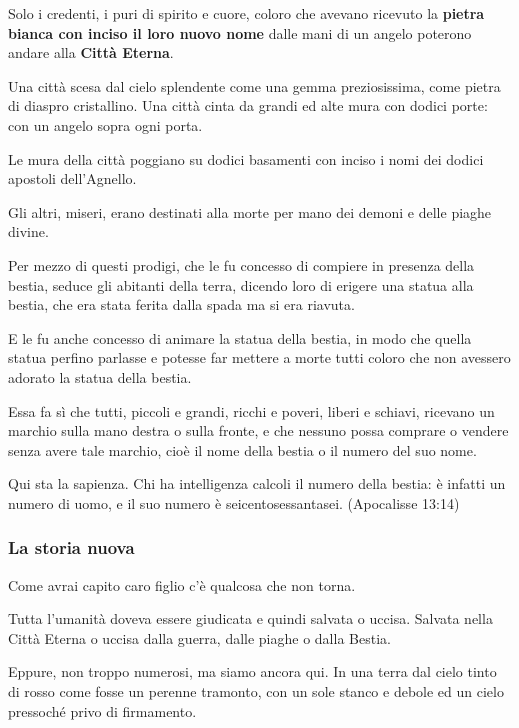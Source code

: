 \documentclass[a4paper,twoside,openany]{book}
\begin{document}
\begin{multicols}{2}
Solo i credenti, i puri di spirito e cuore, coloro che avevano ricevuto la \textbf{pietra bianca con inciso il loro nuovo nome} dalle mani di un angelo poterono andare alla \textbf{Città Eterna}.

Una città scesa dal cielo splendente come una gemma preziosissima, come pietra di diaspro cristallino. Una città cinta da grandi ed alte mura con dodici porte: con un angelo sopra ogni porta.

Le mura della città poggiano su dodici basamenti con inciso i nomi dei dodici apostoli dell’Agnello.

Gli altri, miseri, erano destinati alla morte per mano dei demoni e delle piaghe divine.


\begin{changemargin}{0.3cm}{0.3cm}\begin{enfasi}{
Per mezzo di questi prodigi, che le fu concesso di compiere in presenza della bestia, seduce gli abitanti della terra, dicendo loro di erigere una statua alla bestia, che era stata ferita dalla spada ma si era riavuta.

E le fu anche concesso di animare la statua della bestia, in modo che quella statua perfino parlasse e potesse far mettere a morte tutti coloro che non avessero adorato la statua della bestia.

Essa fa sì che tutti, piccoli e grandi, ricchi e poveri, liberi e schiavi, ricevano un marchio sulla mano destra o sulla fronte, e che nessuno possa comprare o vendere senza avere tale marchio, cioè il nome della bestia o il numero del suo nome.

Qui sta la sapienza. Chi ha intelligenza calcoli il numero della bestia: è infatti un numero di uomo, e il suo numero è seicentosessantasei. (Apocalisse 13:14)
}\end{enfasi}\end{changemargin}


\subsubsection{La storia nuova}

Come avrai capito caro figlio c'è qualcosa che non torna.

Tutta l'umanità doveva essere giudicata e quindi salvata o uccisa. Salvata nella Città Eterna o uccisa dalla guerra, dalle piaghe o dalla Bestia.

Eppure, non troppo numerosi, ma siamo ancora qui. In una terra dal cielo tinto di rosso come fosse un perenne tramonto, con un sole stanco e debole ed un cielo pressoché privo di firmamento.


\end{multicols}
\end{document}
